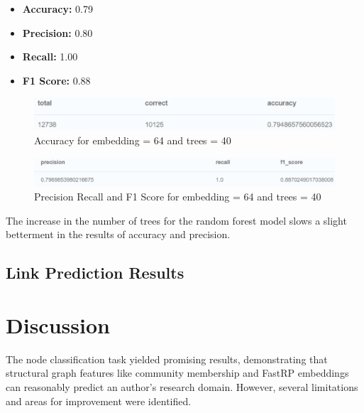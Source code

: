 \documentclass[conference, 12pt]{IEEEtran}
\begin{document}
\begin{itemize}
  \item \textbf{Accuracy:} 0.79
  \item \textbf{Precision:} 0.80
  \item \textbf{Recall:} 1.00
  \item \textbf{F1 Score:} 0.88
\end{itemize}

\begin{figure}[h]
    \centering
    \includegraphics[width=\linewidth]{images/NC_accuracy_3.png} %
    \caption{Accuracy for embedding = 64 and trees = 40}
    \label{fig:accuracy_3}
\end{figure}

\begin{figure}[h]
    \centering
    \includegraphics[width=\linewidth]{images/NC_precision_recall_f1score_3.png} 
    \caption{Precision Recall and F1 Score for embedding = 64 and trees = 40}
    \label{fig:NC_Precision_Recall_3}
\end{figure}

The increase in the number of trees for the random forest model slows a slight betterment in the results of 
accuracy and precision.




\subsection{Link Prediction Results}


\section{Discussion}

The node classification task yielded promising results, demonstrating that structural graph features like community membership and FastRP embeddings can reasonably predict an author's research domain. However, several limitations and areas for improvement were identified.
\end{document}
